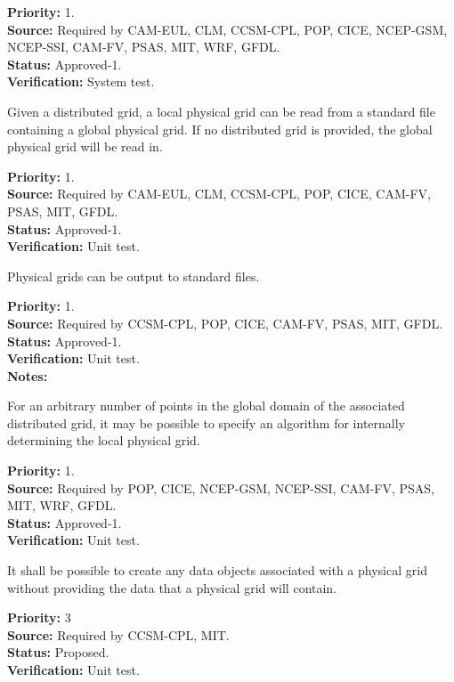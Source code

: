 \begin{reqlist}
{\bf Priority:} 1. \\
{\bf Source:} Required by CAM-EUL, CLM, CCSM-CPL, POP, CICE, NCEP-GSM, NCEP-SSI,
     CAM-FV, PSAS, MIT, WRF, GFDL. \\
{\bf Status:} Approved-1. \\
{\bf Verification:} System test.
\end{reqlist}

Given a distributed grid, a local physical grid can be read from a standard file containing a
global physical grid. If no distributed grid is provided, the global physical grid will
be read in.
\begin{reqlist}
{\bf Priority:} 1. \\
{\bf Source:} Required by CAM-EUL, CLM, CCSM-CPL, POP, CICE, 
              CAM-FV, PSAS, MIT, GFDL. \\
{\bf Status:} Approved-1. \\
{\bf Verification:} Unit test.
\end{reqlist}

Physical grids can be output to standard files.
\begin{reqlist}
{\bf Priority:} 1. \\
{\bf Source:} Required by CCSM-CPL, POP, CICE, 
              CAM-FV, PSAS, MIT, GFDL. \\
{\bf Status:} Approved-1. \\
{\bf Verification:} Unit test.\\
{\bf Notes:} 
\end{reqlist}

For an arbitrary number of points in the global domain of the associated
distributed grid, it may be possible to specify an algorithm for internally
determining the local physical grid.
\begin{reqlist}
{\bf Priority:} 1. \\
{\bf Source:} Required by POP, CICE, NCEP-GSM, NCEP-SSI,
              CAM-FV, PSAS, MIT, WRF, GFDL. \\
{\bf Status:} Approved-1. \\
{\bf Verification:} Unit test.
\end{reqlist}

It shall be possible to create any data objects associated with a physical grid without
providing the data that a physical grid will contain.
\begin{reqlist}
{\bf Priority:} 3\\
{\bf Source:} Required by CCSM-CPL, MIT. \\
{\bf Status:} Proposed. \\
{\bf Verification:} Unit test. 
\end{reqlist}

